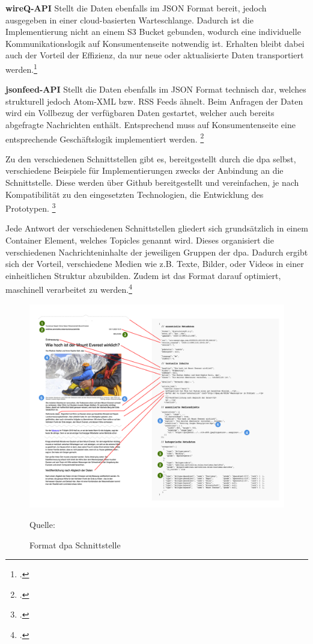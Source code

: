 \textbf{wireQ-API}
Stellt die Daten ebenfalls im JSON Format bereit, jedoch ausgegeben in einer cloud-basierten Warteschlange. Dadurch ist die Implementierung nicht an einem S3 Bucket gebunden, wodurch eine individuelle Kommunikationslogik auf Konsumentenseite notwendig ist. Erhalten bleibt dabei auch der Vorteil der Effizienz, da nur neue oder aktualisierte Daten transportiert werden.\footcite[Vgl.][]{DpaApiDocumentation.APIs.2024}

\textbf{jsonfeed-API}
Stellt die Daten ebenfalls im JSON Format technisch dar, welches strukturell jedoch Atom-XML bzw. RSS Feeds ähnelt. Beim Anfragen der Daten wird ein Vollbezug der verfügbaren Daten gestartet, welcher auch bereits abgefragte Nachrichten enthält. Entsprechend muss auf Konsumentenseite eine entsprechende Geschäftslogik implementiert werden. \footcite[Vgl.][]{DpaApiDocumentation.APIs.2024}
\newpage

Zu den verschiedenen Schnittstellen gibt es, bereitgestellt durch die dpa selbst, verschiedene Beispiele für Implementierungen zwecks der Anbindung an die Schnittstelle. Diese werden über Github bereitgestellt und vereinfachen, je nach Kompatibilität zu den eingesetzten Technologien, die Entwicklung des Prototypen. \footcite[Vgl.][]{dpa_newslab.github.2024}{}{}

Jede Antwort der verschiedenen Schnittstellen gliedert sich grundsätzlich in einem Container Element, welches Topicles genannt wird. Dieses organisiert die verschiedenen Nachrichteninhalte der jeweiligen Gruppen der dpa. Dadurch ergibt sich der Vorteil, verschiedene Medien wie z.B. Texte, Bilder, oder Videos in einer einheitlichen Struktur abzubilden. Zudem ist das Format darauf optimiert, maschinell verarbeitet zu werden.\footcite[Vgl.][]{DpaApiDocumentation.Format.2024}

\begin{figure}[H]
    \centering
    \includegraphics[width=1\linewidth]{abbildungen/dpa doc structure.png}
    \caption{Format dpa Schnittstelle}
    \label{fig:Format dpa Schnittstelle}
    Quelle: 
\end{figure}

